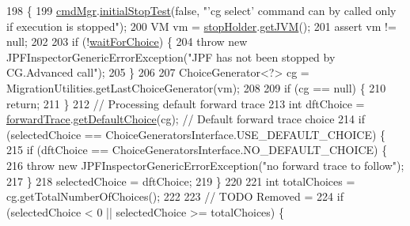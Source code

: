 \begin{DoxyCode}
198                                                                                          \{
199     \hyperlink{classgov_1_1nasa_1_1jpf_1_1inspector_1_1server_1_1choicegenerators_1_1_choice_generators_manager_a406f9dea493308bb7d08d7e788a83f94}{cmdMgr}.\hyperlink{classgov_1_1nasa_1_1jpf_1_1inspector_1_1server_1_1breakpoints_1_1_commands_manager_afe4795e1382183ef74cf03ea0b277c13}{initialStopTest}(\textcolor{keyword}{false}, \textcolor{stringliteral}{"'cg select' command can by called only if execution
       is stopped"});
200     VM vm = \hyperlink{classgov_1_1nasa_1_1jpf_1_1inspector_1_1server_1_1choicegenerators_1_1_choice_generators_manager_af24775b2d725979fea9639be757ea85a}{stopHolder}.\hyperlink{classgov_1_1nasa_1_1jpf_1_1inspector_1_1server_1_1jpf_1_1_stop_holder_a61538f1b06885ad49eabf9d5fd10e254}{getJVM}();
201     assert vm != null;
202 
203     \textcolor{keywordflow}{if} (!\hyperlink{classgov_1_1nasa_1_1jpf_1_1inspector_1_1server_1_1choicegenerators_1_1_choice_generators_manager_a1ef08cad611a7c5476c5e64f2b6d9224}{waitForChoice}) \{
204       \textcolor{keywordflow}{throw} \textcolor{keyword}{new} JPFInspectorGenericErrorException(\textcolor{stringliteral}{"JPF has not been stopped by CG.Advanced call"});
205     \}
206 
207     ChoiceGenerator<?> cg = MigrationUtilities.getLastChoiceGenerator(vm);
208 
209     \textcolor{keywordflow}{if} (cg == null) \{
210       \textcolor{keywordflow}{return};
211     \}
212     \textcolor{comment}{// Processing default forward trace}
213     \textcolor{keywordtype}{int} dftChoice = \hyperlink{classgov_1_1nasa_1_1jpf_1_1inspector_1_1server_1_1choicegenerators_1_1_choice_generators_manager_af50c2456f9d16dcf53d9bd26bc279b29}{forwardTrace}.\hyperlink{classgov_1_1nasa_1_1jpf_1_1inspector_1_1server_1_1breakpoints_1_1_default_forward_trace_manager_a5e478c76207004e5d971178560c255df}{getDefaultChoice}(cg); \textcolor{comment}{// Default forward trace
       choice}
214     \textcolor{keywordflow}{if} (selectedChoice == ChoiceGeneratorsInterface.USE\_DEFAULT\_CHOICE) \{
215       \textcolor{keywordflow}{if} (dftChoice == ChoiceGeneratorsInterface.NO\_DEFAULT\_CHOICE) \{
216         \textcolor{keywordflow}{throw} \textcolor{keyword}{new} JPFInspectorGenericErrorException(\textcolor{stringliteral}{"no forward trace to follow"});
217       \}
218       selectedChoice = dftChoice;
219     \}
220 
221     \textcolor{keywordtype}{int} totalChoices = cg.getTotalNumberOfChoices();
222 
223     \textcolor{comment}{// TODO Removed =}
224     \textcolor{keywordflow}{if} (selectedChoice < 0 || selectedChoice >= totalChoices) \{

\end{DoxyCode}
